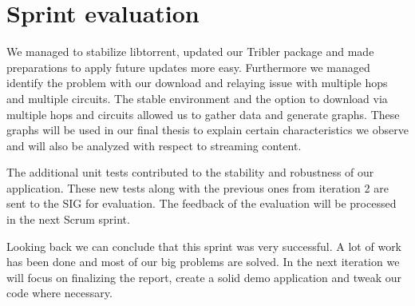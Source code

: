 	\section{Sprint evaluation}
		We managed to stabilize libtorrent, updated our Tribler package and made preparations to apply future updates more easy. Furthermore we managed identify the problem with our download and relaying issue with multiple hops and multiple circuits. The stable environment and the option to download via multiple hops and circuits allowed us to gather data and generate graphs. These graphs will be used in our final thesis to explain certain characteristics we observe and will also be analyzed with respect to streaming content.
		
		The additional unit tests contributed to the stability and robustness of our application. These new tests along with the previous ones from iteration 2 are sent to the SIG for evaluation. The feedback of the evaluation will be processed in the next Scrum sprint.
		
		Looking back we can conclude that this sprint was very successful. A lot of work has been done and most of our big problems are solved. In the next iteration we will focus on finalizing the report, create a solid demo application and tweak our code where necessary.
